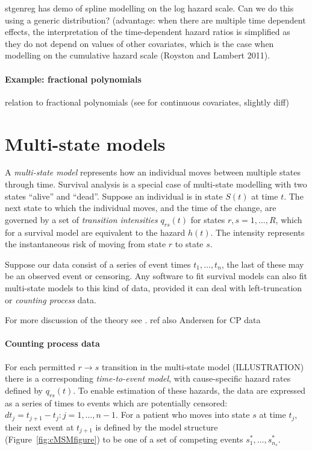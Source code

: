 \documentclass[nojss,nofooter]{jss}
\begin{document}
stgenreg has demo of spline modelling on the log hazard scale.  Can we do this using a generic distribution? 
(advantage: when there are multiple time dependent effects, the
interpretation of the time-dependent hazard ratios is simplified as
they do not depend on values of other covariates, which is the case
when modelling on the cumulative hazard scale (Royston and Lambert
2011).

\paragraph{Example: fractional polynomials}


relation to fractional polynomials 
(see  for continuous covariates, slightly diff)


\section{Multi-state models}

A \emph{multi-state model} represents how an individual moves between
multiple states through time.  Survival analysis is a special case of
multi-state modelling with two states ``alive'' and ``dead''. Suppose
an individual is in state $S(t)$ at time $t$.  The next state to which
the individual moves, and the time of the change, are governed by a
set of \emph{transition intensities} $q_{rs}(t)$ for states $r, s =
1,\dots,R$, which for a survival model are equivalent to the hazard
$h(t)$.  The intensity represents the instantaneous risk of moving
from state $r$ to state $s$.

Suppose our data consist of a series of event times $t_{1},\dots,
t_{n}$, the last of these may be an observed event or censoring.  Any
software to fit survival models can also fit multi-state models to
this kind of data, provided it can deal with left-truncation or
\emph{counting process} data.

For more discussion of the theory see \citet{putter:mstate}. ref also
Andersen for CP data

\paragraph{Counting process data}
For each permitted $r \rightarrow s$ transition in the multi-state
model (ILLUSTRATION) there is a corresponding \emph{time-to-event
  model}, with cause-specific hazard rates defined by $q_{rs}(t)$. To
enable estimation of these hazards, the data are expressed as a series
of times to events which are potentially censored: $dt_{j} = t_{j+1} -
t_{j}: j = 1,\ldots,n-1$. For a patient who moves into state $s$ at
time $t_{j}$, their next event at $t_{j+1}$ is defined by the model
structure (Figure~\ref{fig:cMSMfigure}) to be one of a set of
competing events $s^*_1,\ldots,s^*_{n_s}$.
\end{document}
